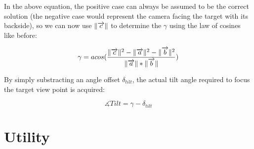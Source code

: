 \documentclass{article}
\DeclarePairedDelimiter\norm{\lVert}{\rVert}%
\begin{document}
In the above equation, the positive case can always be assumed to be the correct solution (the negative case would represent the camera facing the target with its backside), so we can now use $\norm{\overrightarrow{c}}$ to determine the $\gamma$ using the law of cosines like before:

\begin{equation}
\gamma = acos(\frac{\norm{\overrightarrow{c}}^2 - \norm{\overrightarrow{a}}^2 - \norm{\overrightarrow{b}}^2}{\norm{\overrightarrow{a}}*\norm{\overrightarrow{b}}})
\end{equation}

By simply substracting an angle offset $\delta_{tilt}$, the actual tilt angle required to focus the target view point is acquired:

\begin{equation}
\measuredangle{}Tilt = \gamma-\delta_{tilt}
\end{equation}
\section{Utility}


\printbibliography
\end{document}
